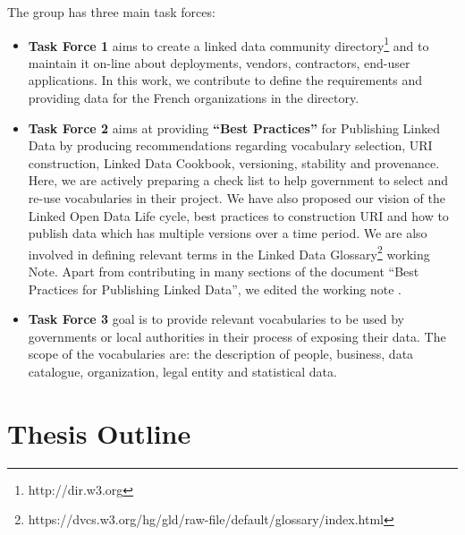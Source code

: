 The group has three main task forces:
\begin{itemize}
\item \textbf{Task Force 1} aims to create a linked data community directory\footnote{http://dir.w3.org} and to maintain it on-line about deployments, vendors, contractors, end-user applications. In this work, we contribute to define the requirements and providing data for the French organizations in the directory.
\item \textbf{Task Force 2} aims at providing \textbf{``Best Practices''} for Publishing Linked Data by producing recommendations regarding vocabulary selection, URI construction, Linked Data Cookbook, versioning, stability and provenance. Here, we are actively preparing a check list to help government to select and re-use vocabularies in their project. We have also proposed our vision of the Linked Open Data Life cycle, best practices to construction URI and how to publish data which has multiple versions over a time period. We are also involved in defining relevant terms in the Linked Data Glossary\footnote{https://dvcs.w3.org/hg/gld/raw-file/default/glossary/index.html} working Note. Apart from contributing in many sections of the document ``Best Practices for Publishing Linked Data'', we edited the working note \cite{wood2012}.

\item \textbf{Task Force 3} goal is to  provide relevant vocabularies to be used by governments or local authorities in their process of exposing their data. The scope of the vocabularies are: the description of people, business, data catalogue, organization, legal entity and statistical data. 
\end{itemize}


\section{Thesis Outline}
\label{sec:thesis-structure}